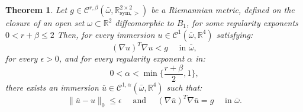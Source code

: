 \documentclass[reqno,twoside,11pt]{amsart}
\newcommand{\sym}{\mathrm{sym}}
\newcommand{\R}{\mathbb{R}}
\numberwithin{equation}{section}
\theoremstyle{plain}
\newtheorem{theorem}{Theorem}[section]
\theoremstyle{definition}
\begin{document}
\begin{theorem}\label{thm_main}
Let $g\in \mathcal{C}^{r,\beta}(\bar\omega, \R^{2\times 2}_{\sym,>})$  be
a Riemannian metric, defined on the closure of an open set $\omega\subset\R^2$
diffeomorphic to $B_1$, for some regularity exponents $0<r+\beta\leq 2$ 
Then, for every immersion $u\in \mathcal{C}^1(\bar\omega,\R^4)$ satisfying:
$$ (\nabla u)^T\nabla u < g \quad \mbox{ in }\bar\omega,$$
for every $\epsilon>0$, and for every regularity exponent $\alpha$ in:
\begin{equation*}
0<\alpha<\min\Big\{\frac{r+\beta}{2}, 1\Big\},
\end{equation*}
there exists an immersion $\bar u\in \mathcal{C}^{1,\alpha}(\bar\omega,\R^4)$ such that:
$$ \|\bar u - u\|_0\leq \epsilon \quad\mbox{ and } \quad 
(\nabla \bar u)^T\nabla \bar u = g \quad \mbox{ in }\bar\omega.$$
\end{theorem}

\medskip
\end{document}
